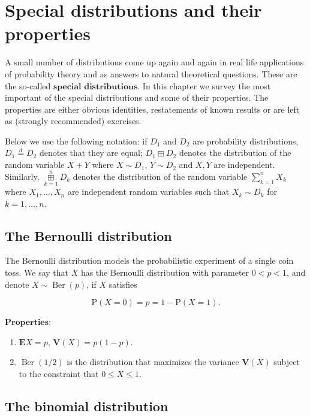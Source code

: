 \documentclass[11pt]{report}
\theoremstyle{plain}
\theoremstyle{definition}
\begin{document}
\chapter{Special distributions and their properties}

A small number of distributions come up again and
again in real life applications of probability theory
and as answers to natural theoretical questions. These
are the so-called $\textbf{special distributions}$.
In this chapter we survey the most important of the
special distributions and some of their properties.
The properties are either obvious identities,
restatements of known results or are left as (strongly
recommended) exercises.

Below we use the following notation: if $D_1$ and
$D_2$ are probability distributions,
$D_1 \stackrel{d}{=} D_2$ denotes that they are
equal; $D_1\boxplus D_2$ denotes the distribution of
the random variable $X+Y$ where $X\sim D_1$,
$Y\sim D_2$ and $X,Y$ are independent. Similarly,
$\mathop{\boxplus}\limits_{k=1}^n D_k$ denotes the
distribution of the random variable $\sum_{k=1}^n X_k$
where $X_1,\ldots,X_n$ are independent random
variables such that $X_k \sim D_k$ for $k=1,\ldots,n$.

\section{The Bernoulli distribution}

The Bernoulli distribution models the probabilistic
experiment of a single coin toss. We say that $X$ has
the Bernoulli distribution with parameter $0<p<1$,
and denote $X \sim \operatorname{Ber}(p)$, if $X$
satisfies

\[
\mathrm{P}(X=0)=p = 1-\mathrm{P}(X=1).
\]

\noindent $\textbf{Properties:}$

\begin{enumerate}[label=\arabic*.]
\item $\mathbf{E} X = p$, $\mathbf{V}(X) = p(1-p)$.

\item $\operatorname{Ber}(1/2)$ is the distribution that
maximizes the variance $\mathbf{V}(X)$ subject to the
constraint that $0\le X\le 1$.
\end{enumerate}

\section{The binomial distribution}
\end{document}
